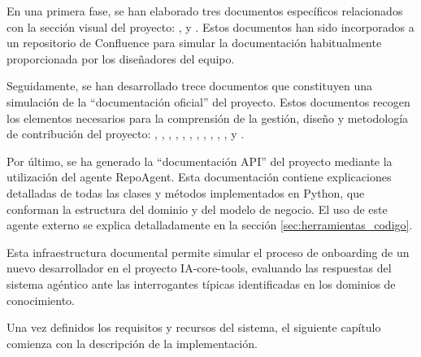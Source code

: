 En una primera fase, se han elaborado tres documentos específicos relacionados con la sección visual del proyecto: ,  y . Estos documentos han sido incorporados a un repositorio de Confluence para simular la documentación habitualmente proporcionada por los diseñadores del equipo.

Seguidamente, se han desarrollado trece documentos que constituyen una simulación de la ``documentación oficial'' del proyecto. Estos documentos recogen los elementos necesarios para la comprensión de la gestión, diseño y metodología de contribución del proyecto: , , , , , , , , , , ,  y .

Por último, se ha generado la ``documentación API'' del proyecto mediante la utilización del agente RepoAgent\cite{luo_repoagent_2024}. Esta documentación contiene explicaciones detalladas de todas las clases y métodos implementados en Python, que conforman la estructura  del dominio y del modelo de negocio. El uso de este agente externo se explica detalladamente en la sección \ref{sec:herramientas_codigo}.

Esta infraestructura documental permite simular el proceso de onboarding de un nuevo desarrollador en el proyecto IA-core-tools, evaluando las respuestas del sistema agéntico ante las interrogantes típicas identificadas en los dominios de conocimiento.

Una vez definidos los requisitos y recursos del sistema, el siguiente capítulo comienza con la descripción de la implementación.







